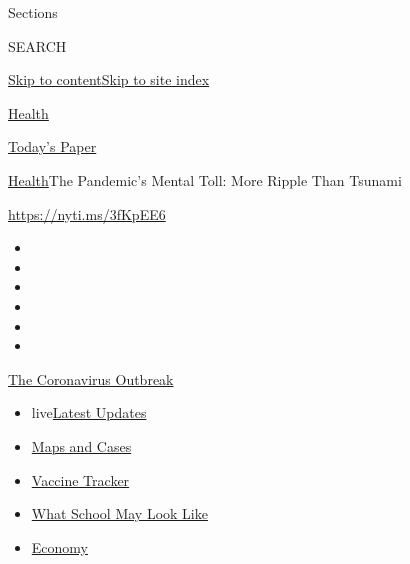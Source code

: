 Sections

SEARCH

\protect\hyperlink{site-content}{Skip to
content}\protect\hyperlink{site-index}{Skip to site index}

\href{https://www.nytimes.com/section/health}{Health}

\href{https://myaccount.nytimes.com/auth/login?response_type=cookie\&client_id=vi}{}

\href{https://www.nytimes.com/section/todayspaper}{Today's Paper}

\href{/section/health}{Health}\textbar{}The Pandemic's Mental Toll: More
Ripple Than Tsunami

\url{https://nyti.ms/3fKpEE6}

\begin{itemize}
\item
\item
\item
\item
\item
\item
\end{itemize}

\href{https://www.nytimes.com/news-event/coronavirus?action=click\&pgtype=Article\&state=default\&region=TOP_BANNER\&context=storylines_menu}{The
Coronavirus Outbreak}

\begin{itemize}
\tightlist
\item
  live\href{https://www.nytimes.com/2020/08/01/world/coronavirus-covid-19.html?action=click\&pgtype=Article\&state=default\&region=TOP_BANNER\&context=storylines_menu}{Latest
  Updates}
\item
  \href{https://www.nytimes.com/interactive/2020/us/coronavirus-us-cases.html?action=click\&pgtype=Article\&state=default\&region=TOP_BANNER\&context=storylines_menu}{Maps
  and Cases}
\item
  \href{https://www.nytimes.com/interactive/2020/science/coronavirus-vaccine-tracker.html?action=click\&pgtype=Article\&state=default\&region=TOP_BANNER\&context=storylines_menu}{Vaccine
  Tracker}
\item
  \href{https://www.nytimes.com/interactive/2020/07/29/us/schools-reopening-coronavirus.html?action=click\&pgtype=Article\&state=default\&region=TOP_BANNER\&context=storylines_menu}{What
  School May Look Like}
\item
  \href{https://www.nytimes.com/live/2020/07/31/business/stock-market-today-coronavirus?action=click\&pgtype=Article\&state=default\&region=TOP_BANNER\&context=storylines_menu}{Economy}
\end{itemize}


